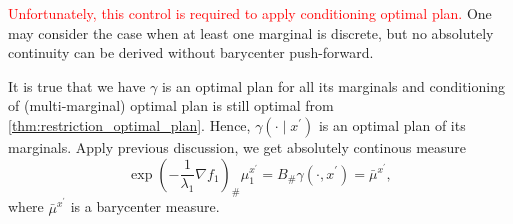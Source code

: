 \textcolor{red}{Unfortunately, this control is required to apply conditioning optimal plan.}
One may consider the case when at least one marginal is discrete,
but no absolutely continuity can be derived without barycenter push-forward.

It is true that we have $\gamma$ is an optimal plan for all its marginals
and conditioning of (multi-marginal) optimal plan is still optimal from \cref{thm:restriction_optimal_plan}.
Hence, $\gamma(\cdot \mid x^\prime)$ is an optimal plan of its marginals.
Apply previous discussion, we get absolutely continous measure
\[
	\exp(-\frac{1}{\lambda_1}\nabla f_1)_{\#}  \mu_1^{x^\prime}=
	B_{\#}\gamma(\cdot, x^\prime) =
	\bar{\mu}^{x^\prime},
\]
where $\bar{\mu}^{x^\prime}$ is a barycenter measure.




